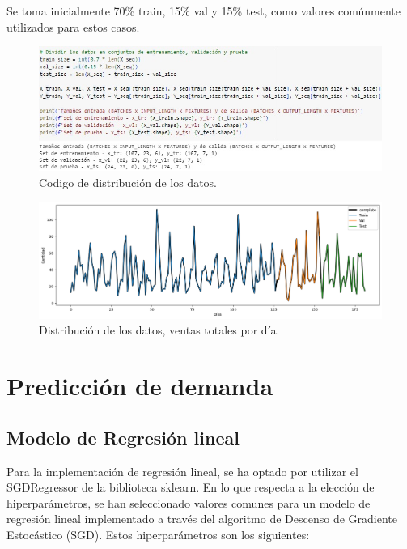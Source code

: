 Se toma inicialmente 70\% train, 15\% val y 15\% test, como valores comúnmente
utilizados para estos casos.
\begin{figure}[H]
  \begin{center}
    \includegraphics[scale=0.75]{./divisionde _datos.jpg}
    \caption{Codigo de distribución de los datos.}
    \label{fig:distribucion_algoritmo}
  \end{center}
\end{figure}

\begin{figure}[H]
  \begin{center}
    \includegraphics[scale=0.40]{./serie_normal_dividida.png}
    \caption{Distribución de los datos, ventas totales por día.}
    \label{fig:distribucion_datos}
  \end{center}
\end{figure}

\section{Predicción de demanda}

\subsection{Modelo de Regresión lineal}


Para la implementación de regresión lineal, se ha optado por utilizar el
SGDRegressor de la biblioteca sklearn. En lo que respecta a la elección de
hiperparámetros, se han seleccionado valores comunes para un modelo de
regresión lineal implementado a través del algoritmo de Descenso de Gradiente
Estocástico (SGD). Estos hiperparámetros son los siguientes:

